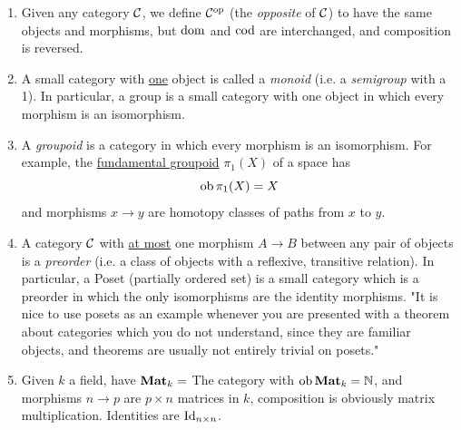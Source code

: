 \documentclass{article}
\begin{document}
\begin{enumerate}
\[    \cat{Set} \subset \cat{Part} \subset \cat{Rel}. \]
    \item[(f)] Given any category $\mathcal{C}$, we define $\mathcal{C}^{\text{op}}$ (the \textit{opposite} of $\mathcal{C}$) to have the same objects and morphisms, but $\operatorname{dom}$ and $\operatorname{cod}$ are interchanged, and composition is reversed.
    \item[(g)] A small category with \underline{one} object is called a \textit{monoid} (i.e. a \textit{semigroup} with a 1). In particular, a group is a small category with one object in which every morphism is an isomorphism.
    \item[(h)] A \textit{groupoid} is a category in which every morphism is an isomorphism. For example, the \underline{fundamental groupoid} $\pi_{1}(X)$ of a space has \[ \operatorname{ob} \pi_{1}(X) = X \]
    and morphisms $x \to y$ are homotopy classes of paths from $x$ to $y$.
    \item[(i)] A category $\mathcal{C}$ with \underline{at most} one morphism $A \to B$ between any pair of objects is a \textit{preorder} (i.e. a class of objects with a reflexive, transitive relation). \gap In particular, a Poset (partially ordered set) is a small category which is a preorder in which the only isomorphisms are the identity morphisms. \gap "It is nice to use posets as an example whenever you are presented with a theorem about categories which you do not understand, since they are familiar objects, and theorems are usually not entirely trivial on posets."
    \item[(j)] Given $k$ a field, have $\textbf{Mat$_{k}$} = $ The category with $\operatorname{ob} \textbf{Mat$_{k}$} = \mathbb{N}$, and morphisms $n \to p$ are $p\times n$ matrices in $k$, composition is obviously matrix multiplication. Identities are $\operatorname{Id}_{n \times n}$.
\end{enumerate}





\newlec


\end{document}
